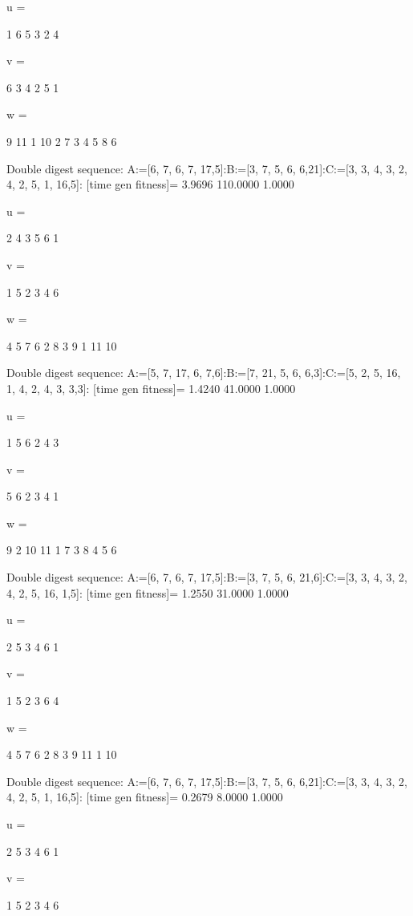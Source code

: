 u =

     1     6     5     3     2     4


v =

     6     3     4     2     5     1


w =

     9    11     1    10     2     7     3     4     5     8     6

Double digest sequence:
A:=[6, 7, 6, 7, 17,5]:B:=[3, 7, 5, 6, 6,21]:C:=[3, 3, 4, 3, 2, 4, 2, 5, 1, 16,5]:
[time gen fitness]=
    3.9696  110.0000    1.0000


u =

     2     4     3     5     6     1


v =

     1     5     2     3     4     6


w =

     4     5     7     6     2     8     3     9     1    11    10

Double digest sequence:
A:=[5, 7, 17, 6, 7,6]:B:=[7, 21, 5, 6, 6,3]:C:=[5, 2, 5, 16, 1, 4, 2, 4, 3, 3,3]:
[time gen fitness]=
    1.4240   41.0000    1.0000


u =

     1     5     6     2     4     3


v =

     5     6     2     3     4     1


w =

     9     2    10    11     1     7     3     8     4     5     6

Double digest sequence:
A:=[6, 7, 6, 7, 17,5]:B:=[3, 7, 5, 6, 21,6]:C:=[3, 3, 4, 3, 2, 4, 2, 5, 16, 1,5]:
[time gen fitness]=
    1.2550   31.0000    1.0000


u =

     2     5     3     4     6     1


v =

     1     5     2     3     6     4


w =

     4     5     7     6     2     8     3     9    11     1    10

Double digest sequence:
A:=[6, 7, 6, 7, 17,5]:B:=[3, 7, 5, 6, 6,21]:C:=[3, 3, 4, 3, 2, 4, 2, 5, 1, 16,5]:
[time gen fitness]=
    0.2679    8.0000    1.0000


u =

     2     5     3     4     6     1


v =

     1     5     2     3     4     6


